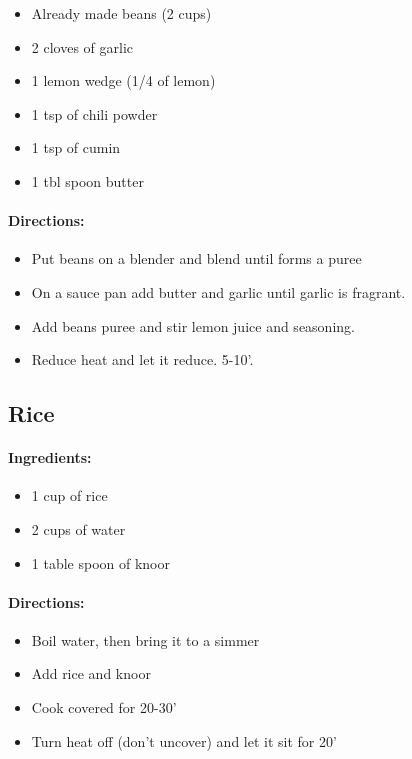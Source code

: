 \documentclass{article}
\begin{document}
\begin{itemize}
	\item Already made beans (2 cups)
	\item 2 cloves of garlic
	\item 1 lemon wedge (1/4 of lemon)
	\item 1 tsp of chili powder
	\item 1 tsp of cumin
	\item 1 tbl spoon butter
\end{itemize}

\paragraph{Directions:}
\begin{itemize}
	\item Put beans on a blender and blend until forms a puree
	\item On a sauce pan add butter and garlic until garlic is fragrant.
	\item Add beans puree and stir lemon juice and seasoning.
	\item Reduce heat and let it reduce. 5-10'.
\end{itemize} 

\subsection{Rice}

\paragraph{Ingredients:}

\begin{itemize}
	\item 1 cup of rice
	\item 2 cups of water
	\item 1 table spoon of knoor
\end{itemize}

\paragraph{Directions:}
\begin{itemize}
	\item Boil water, then bring it to a simmer
	\item Add rice and knoor
	\item Cook covered for 20-30'
	\item Turn heat off (don't uncover) and let it sit for 20'
\end{itemize} 
\end{document}
